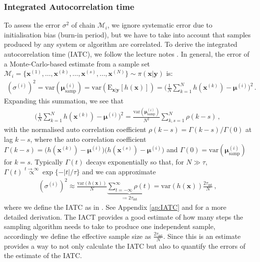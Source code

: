 \subsubsection{Integrated Autocorrelation time}
To assess the error $\sigma^2$ of chain $\mathcal{M}_i$, we ignore systematic error due to initialisation bias (burn-in period), but we have to take into account that samples produced by any system or algorithm are correlated.
To derive the integrated autocorrelation time (IATC), we follow the lecture notes \cite{wolff2002LecNot}.
In general, the error of a Monte-Carlo-based estimate from a sample set $\mathcal{M}_i = \{\bm{x}^{(1)}, \dots,\bm{x}^{(k)},\dots, \bm{x}^{(s)},\dots, \bm{x}^{(N)}\} \sim \pi(\bm{x}|\bm{y})$ is:
\begin{align}
	(\sigma^{(i)})^2 = \text{var}(\bm{\mu}^{(i)}_{\text{samp}} ) =  \text{var}(\text{E}_{\bm{x}|\bm{y}} [h(\bm{x})]) = \Bigg( \frac{1}{N} \sum_{k=1}^{N} h(\bm{x}^{(k)}) - \bm{\mu}^{(i)} \Bigg)^2 \, .
\end{align}
Expanding this summation, we see that
\begin{align}
	\Bigg( \frac{1}{N} \sum_{k=1}^{N} h(\bm{x}^{(k)}) - \bm{\mu}^{(i)} \Bigg)^2  =  \frac{\text{var}(\bm{\mu}^{(i)}_{\text{samp}}) }{N^2} \sum_{k,s=1}^{N}\rho(k-s)\, ,
\end{align}
with the normalised auto correlation coefficient $\rho(k-s) =  \Gamma(k-s)/ \Gamma(0)$ at lag $k-s$, where the auto correlation coefficient $\Gamma(k-s) =  \big( h(\bm{x}^{(k)}) - \bm{\mu}^{(i)} \big) \big(h(\bm{x}^{(s)}) - \bm{\mu}^{(i)} \big)$ and  $\Gamma(0) = \text{var}(\bm{\mu}^{(i)}_{\text{samp}} )$ for $k=s$.
Typically $\Gamma(t)$ decays exponentially so that, for $N\gg \tau$, $\Gamma(t) \overset{t \rightarrow \infty }{ \propto} \exp\{ - | t| / \tau \}  $ and we can approximate
\begin{align}
	(\sigma^{(i)})^2   \approx  \frac{\text{var}(h(\bm{x}) )}{N} \underbrace{\sum_{t = - \infty }^{\infty} \rho(t)}_{ \coloneqq 	2\tau_{\text{int}} } = \text{var}(h(\bm{x})) \frac{ 2 \tau_{\text{int}} }{N} \, , \label{eq:MCerr}
\end{align}
where we define the IATC as in \cite[pp. 103-105]{wolff2002LecNot}.
See Appendix \ref{ap:IATC} and \cite{Sokal1997} for a more detailed derivation.
The IACT provides a good estimate of how many steps the sampling algorithm needs to take to produce one independent sample, accordingly we define the effective sample size as $\frac{ 2 \tau_{\text{int}} }{N}$.
Since this is an estimate \cite{wolff2004monte} provides a way to not only calculate the IATC but also to quantify the errors of the estimate of the IATC.

